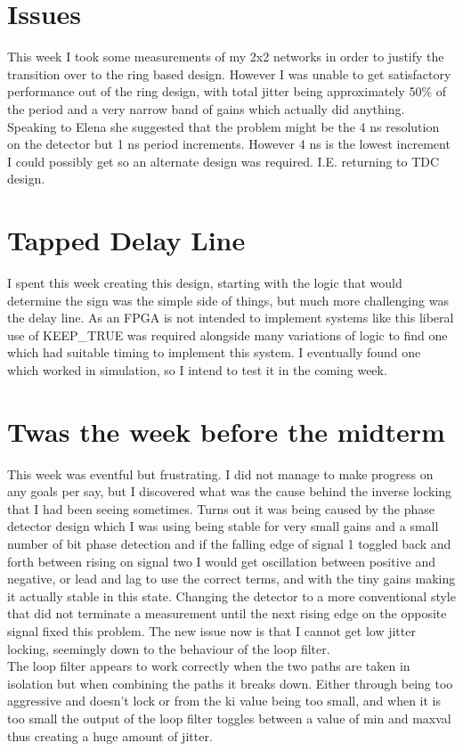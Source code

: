 \documentclass[a4paper,12pt]{report}
\begin{document}
\section*{Issues}
This week I took some measurements of my 2x2 networks in order to justify the transition over to the ring based design. However I was unable to get satisfactory performance out of the ring design, with total jitter being approximately 50\% of the period and a very narrow band of gains which actually did anything.
Speaking to Elena she suggested that the problem might be the 4 ns resolution on the detector but 1 ns period increments. However 4 ns is the lowest increment I could possibly get so an alternate design was required. I.E. returning to TDC design.

\section*{Tapped Delay Line}
I spent this week creating this design, starting with the logic that would determine the sign was the simple side of things, but much more challenging was the delay line. As an FPGA is not intended to implement systems like this liberal use of KEEP\_TRUE was required alongside many variations of logic to find one which had suitable timing to implement this system. I eventually found one which worked in simulation, so I intend to test it in the coming week.

\section*{Twas the week before the midterm}
This week was eventful but frustrating. I did not manage to make progress on any goals per say, but I discovered what was the cause behind the inverse locking that I had been seeing sometimes. Turns out it was being caused by the phase detector design which I was using being stable for very small gains and a small number of bit phase detection and if the falling edge of signal 1 toggled back and forth between rising on signal two I would get oscillation between positive and negative, or lead and lag to use the correct terms, and with the tiny gains making it actually stable in this state. Changing the detector to a more conventional style that did not terminate a measurement until the next rising edge on the opposite signal fixed this problem. The new issue now is that I cannot get low jitter locking, seemingly down to the behaviour of the loop filter.\\
The loop filter appears to work correctly when the two paths are taken in isolation but when combining the paths it breaks down. Either through being too aggressive and doesn't lock or from the ki value being too small, and when it is too small the output of the loop filter toggles between a value of min and maxval thus creating a huge amount of jitter.
\end{document}
